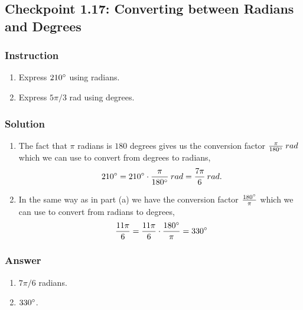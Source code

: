 \subsection*{Checkpoint 1.17: Converting between Radians and Degrees}

\subsubsection*{Instruction}

\begin{enumerate}[label=(\alph*)]
  \item
    Express $210\degree$ using radians.
  \item
    Express $5\pi/3$ rad using degrees.
\end{enumerate}

\subsubsection*{Solution}
\begin{enumerate}[label=(\alph*)]
  \item
    The fact that $\pi$ radians is $180$ degrees gives us the conversion factor $\frac{\pi}{180\degree} \: rad$ which we can use to convert from degrees to radians,
    \[\phantom{.} 210 \degree = 210 \degree \cdot \frac{\pi}{180\degree} \: rad = \frac{7\pi}{6} \: rad.\]
  \item
    In the same way as in part (a) we have the conversion factor  $\frac{180\degree}{\pi}$ which we can use to convert from radians to degrees,
    \[\phantom{.} \frac{11\pi}{6} = \frac{11\pi}{6} \cdot \frac{180\degree}{\pi} = 330\degree\]
\end{enumerate}

\subsubsection*{Answer}

\begin{enumerate}[label=(\alph*)]
  \item
    $7\pi/6$ radians.
  \item
    $330\degree$.
\end{enumerate}
